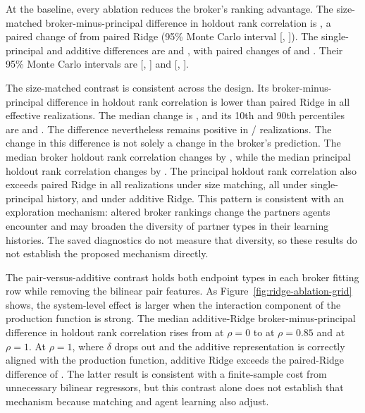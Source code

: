 At the baseline, every ablation reduces the broker's ranking advantage. The
size-matched broker-minus-principal difference in holdout rank correlation is
, a paired change of
 from paired Ridge (95\% Monte Carlo
interval [,
]). The single-principal and
additive differences are  and
, with paired changes of
 and
. Their 95\% Monte Carlo intervals are
[,
] and
[,
].

The size-matched contrast is consistent across the design. Its
broker-minus-principal difference in holdout rank correlation is lower than
paired Ridge in all  effective realizations. The
median change is , and its 10th and 90th
percentiles are  and
. The difference nevertheless remains positive in
/ realizations. The change
in this difference is not solely a change in the broker's prediction. The median
broker holdout rank correlation changes by
, while the median principal
holdout rank correlation changes by
. The principal holdout rank correlation
also exceeds paired Ridge in all 
realizations under size matching, all
 under single-principal
history, and  under additive Ridge.
This pattern is consistent with an exploration mechanism: altered broker
rankings change the partners agents encounter and may broaden the diversity of
partner types in their learning histories. The saved diagnostics do not
measure that diversity, so these results do not establish the proposed
mechanism directly.

The pair-versus-additive contrast holds both endpoint types in each broker
fitting row while removing the bilinear pair features. As
Figure~\ref{fig:ridge-ablation-grid} shows, the system-level effect is larger
when the interaction component of the production function is strong. The median
additive-Ridge broker-minus-principal difference in holdout rank correlation
rises from
 at $\rho=0$ to
 at $\rho=0.85$ and
 at $\rho=1$. At $\rho=1$, where $\delta$ drops out
and the additive representation is correctly aligned with the production
function, additive Ridge exceeds the paired-Ridge difference of
. The latter result is consistent with a finite-sample
cost from unnecessary bilinear regressors, but this contrast alone
does not establish that mechanism because matching and agent learning also
adjust.

